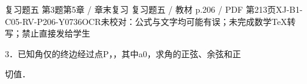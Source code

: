 \begin{bankitem}{复习题五 第3题}{第5章 / 章末复习 复习题五 / 教材 p.206 / PDF 第213页}{XJ-B1-C05-RV-P206-Y0736}{OCR未校对：公式与文字均可能有误；未完成数学TeX转写；禁止直接发给学生}
\begin{ocrdraft}
\par
3．已知角仅的终边经过点P，，其中a0，求角的正弦、余弦和正
\par
切值．
\end{ocrdraft}
\end{bankitem}
